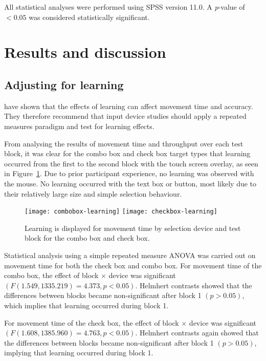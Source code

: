 \documentclass{elsart}
\begin{document}
All statistical analyses were performed using SPSS version 11.0. A
\emph{p}-value of \(< 0.05\) was considered statistically significant.


\section{Results and discussion}
\label{sec-results}


\subsection{Adjusting for learning}
\label{sec-results-learning}

\citet{Doug-SA-1999-CHI} have shown that the effects of learning can
affect movement time and accuracy. They therefore recommend that input
device studies should apply a repeated measures paradigm and test for
learning effects.

From analysing the results of movement time and throughput over each
test block, it was clear for the combo box and check box target types
that learning occurred from the first to the second block with the touch
screen overlay, as seen in Figure~\ref{fig-movement-time-learning}. Due
to prior participant experience, no learning was observed with the
mouse. No learning occurred with the text box or button, most likely due
to their relatively large size and simple selection behaviour.


\begin{figure}
	\centering
	\texttt{[image: combobox-learning]}
	\texttt{[image: checkbox-learning]}
	\caption{Learning is displayed for movement time by selection device
	and test block for the combo box and check box.}
	\label{fig-movement-time-learning}
\end{figure}


Statistical analysis using a simple repeated measure ANOVA was carried
out on movement time for both the check box and combo box. For movement
time of the combo box, the effect of block \(\times\) device was
significant \((F(1.549, 1335.219) = 4.373, p < 0.05)\). Helmhert
contrasts showed that the differences between blocks became
non-significant after block 1 \((p > 0.05)\), which implies that
learning occurred during block 1.

For movement time of the check box, the effect of block \(\times\)
device was significant \((F(1.608, 1385.960) = 4.763, p < 0.05)\).
Helmhert contrasts again showed that the differences between blocks
became non-significant after block 1 \((p > 0.05)\), implying that
learning occurred during block 1.
\end{document}
